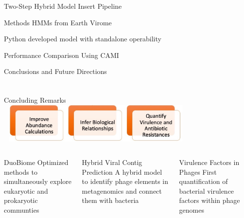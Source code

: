 \documentclass[11pt, xcolor=table]{beamer}
\begin{document}
  \begin{frame}{Two-Step Hybrid Model}
  Insert Pipeline
  
  \end{frame}
  
  \begin{frame}{Methods}
  HMMs from Earth Virome
  
  Python developed model with standalone operability
  
  \end{frame}

  \begin{frame}{Performance Comparison Using CAMI}

	\end{frame}
	
	
	\begin{frame}{Conclusions and Future Directions}

	\end{frame}

\section{}

	\begin{frame}{Concluding Remarks}
	\center
	\includegraphics[height=2cm, width=10cm]{goals.jpg}
	\begin{columns}
	\begin{block}{DuoBiome}
	Optimized methods to simultaneously explore eukaryotic and prokaryotic communties
	\end{block}
	\begin{block}{Hybrid Viral Contig Prediction}
	A hybrid model to identify phage elements in metagenomics and connect them with bacteria
	\end{block}
	\begin{block}{Virulence Factors in Phages}
	First quantification of bacterial virulence factors within phage genomes
	\end{block}
	
	\end{columns}
	
	\end{frame}
	
\end{document}
